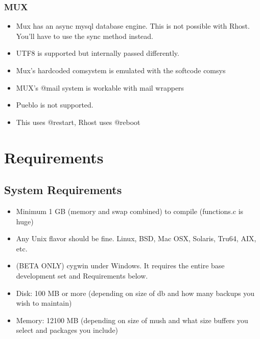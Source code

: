 \documentclass[letterpaper,10pt,english]{sphinxmanual}
\begin{document}
\subsubsection{MUX}
\label{\detokenize{differences:id11}}\begin{itemize}
\item {} 
\sphinxAtStartPar
Mux has an async mysql database engine.  This is not possible with Rhost.  You’ll have to use the sync method instead.

\item {} 
\sphinxAtStartPar
UTF8 is supported but internally passed differently.

\item {} 
\sphinxAtStartPar
Mux’s hardcoded comsystem is emulated with the softcode comsys

\item {} 
\sphinxAtStartPar
MUX’s @mail system is workable with mail wrappers

\item {} 
\sphinxAtStartPar
Pueblo is not supported.

\item {} 
\sphinxAtStartPar
This uses @restart, Rhost uses @reboot

\end{itemize}


\section{Requirements}
\label{\detokenize{requirements:requirements}}\label{\detokenize{requirements:id1}}\label{\detokenize{requirements::doc}}

\subsection{System Requirements}
\label{\detokenize{requirements:system-requirements}}\begin{itemize}
\item {} 
\sphinxAtStartPar
Minimum 1 GB (memory and swap combined) to compile (functions.c is huge)

\item {} 
\sphinxAtStartPar
Any Unix flavor should be fine.  Linux, BSD, Mac OSX, Solaris, Tru64, AIX, etc.

\item {} 
\sphinxAtStartPar
(BETA ONLY) cygwin under Windows.  It requires the entire base development set and Requirements below.

\item {} 
\sphinxAtStartPar
Disk:  100 MB or more (depending on size of db and how many backups you wish to maintain)

\item {} 
\sphinxAtStartPar
Memory: 12\sphinxhyphen{}100 MB (depending on size of mush and what size buffers you select and packages you include)

\end{itemize}
\end{document}
